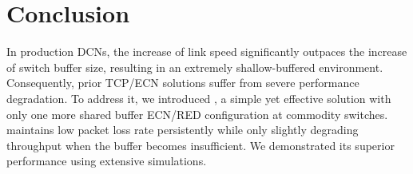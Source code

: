 \section{Conclusion}\label{sec:conclusion}

In production DCNs, the increase of link speed significantly outpaces the increase of switch buffer size, resulting in an extremely shallow-buffered environment. Consequently, prior TCP/ECN solutions suffer from severe performance degradation. To address it, we introduced \sys, a simple yet effective solution with only one more shared buffer ECN/RED configuration at commodity switches. \sys maintains low packet loss rate persistently while only slightly degrading throughput when the buffer becomes insufficient. We demonstrated its superior performance using extensive simulations. 